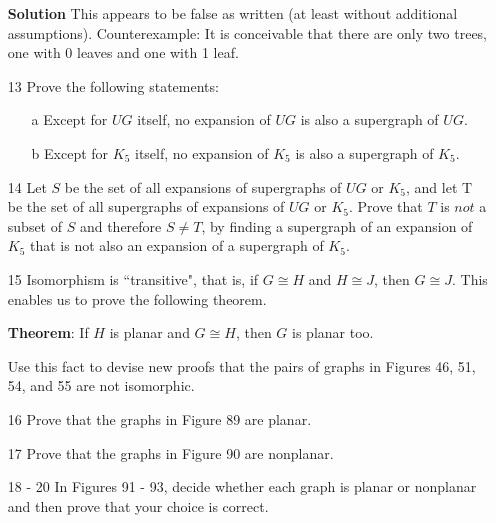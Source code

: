 \documentclass{article}
\begin{document}
\begin{enumerate}
	\textbf{Solution} This appears to be false as written (at least without additional assumptions). Counterexample: It is conceivable that there are only two trees, one with 0 leaves and one with 1 leaf.
	\item[13] Prove the following statements:
		\begin{enumerate}
			\item[a] Except for $UG$ itself, no expansion of $UG$ is also a supergraph of $UG$.
			\item[b] Except for $K_5$ itself, no expansion of $K_5$ is also a supergraph of $K_5$.
		\end{enumerate}
	\item[14] Let $S$ be the set of all expansions of supergraphs of $UG$ or $K_5$, and let T be the set of all supergraphs of expansions of $UG$ or $K_5$. Prove that $T$ is $not$ a subset of $S$ and therefore $S \neq T$, by finding a supergraph of an expansion of $K_5$ that is not also an expansion of a supergraph of $K_5$.
	\item[15] Isomorphism is ``transitive", that is, if $G \cong H$ and $H \cong J$, then $G \cong J$. This enables us to prove the following theorem.
	
	\textbf{Theorem}: If $H$ is planar and $G \cong H$, then $G$ is planar too.
	
	Use this fact to devise new proofs that the pairs of graphs in Figures 46, 51, 54, and 55 are not isomorphic.
	\item[16] Prove that the graphs in Figure 89 are planar.
	\item[17] Prove that the graphs in Figure 90 are nonplanar.
	\item[18 - 20] In Figures 91 - 93, decide whether each graph is planar or nonplanar and then prove that your choice is correct.
\end{enumerate}
\end{document}
